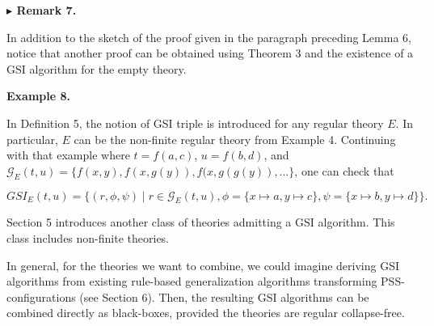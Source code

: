  
 
 
\par\medskip\noindent\textbf{$\blacktriangleright$ Remark 7.}\par
 
 
In addition to the sketch of the proof given in the paragraph preceding Lemma 6, notice that another proof can be obtained using Theorem 3 and the existence of a GSI algorithm for the empty theory.\par
 
 
 
 
\par\medskip\noindent\textbf{Example 8.}\par
 
 
In Definition 5, the notion of GSI triple is introduced for any regular theory $E$. In particular, $E$ can be the non-finite regular theory from Example 4. Continuing with that example where $t=f(a,c)$, $u=f(b,d)$, and $\mathcal{G}_{E}(t,u)=\{f(x,y),f(x,g(y)),f(x,g(g(y)),\ldots\}$, one can check that\par
  
\par  \quad  \[GSI_{E}(t,u)=\{(r,\phi,\psi)\mid r\in\mathcal{G}_{E}(t,u),\phi=\{x\mapsto a,y\mapsto c\},\psi=\{x\mapsto b,y\mapsto d\}\}.\]\quad  \quad  
  
 
 
 
Section 5 introduces another class of theories admitting a GSI algorithm. This class includes non-finite theories.\par
 
 
 
In general, for the theories we want to combine, we could imagine deriving GSI algorithms from existing rule-based generalization algorithms transforming PSS-configurations (see Section 6). Then, the resulting GSI algorithms can be combined directly as black-boxes, provided the theories are regular collapse-free.\par
 
